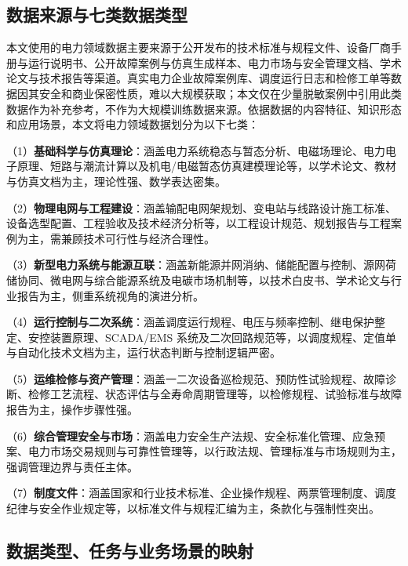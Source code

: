 \documentclass[fontset=fandol,type=master,campus=shenzhen,etitleauto=true]{hithesisbook}
\begin{document}
\subsection{数据来源与七类数据类型}\label{ux6570ux636eux6765ux6e90ux4e0eux4e03ux7c7bux6570ux636eux7c7bux578b}

本文使用的电力领域数据主要来源于公开发布的技术标准与规程文件、设备厂商手册与运行说明书、公开故障案例与仿真生成样本、电力市场与安全管理文档、学术论文与技术报告等渠道。真实电力企业故障案例库、调度运行日志和检修工单等数据因其安全和商业保密性质，难以大规模获取；本文仅在少量脱敏案例中引用此类数据作为补充参考，不作为大规模训练数据来源。依据数据的内容特征、知识形态和应用场景，本文将电力领域数据划分为以下七类：

\noindent （1）\textbf{基础科学与仿真理论}：涵盖电力系统稳态与暂态分析、电磁场理论、电力电子原理、短路与潮流计算以及机电/电磁暂态仿真建模理论等，以学术论文、教材与仿真文档为主，理论性强、数学表达密集。

\noindent （2）\textbf{物理电网与工程建设}：涵盖输配电网架规划、变电站与线路设计施工标准、设备选型配置、工程验收及技术经济分析等，以工程设计规范、规划报告与工程案例为主，需兼顾技术可行性与经济合理性。

\noindent （3）\textbf{新型电力系统与能源互联}：涵盖新能源并网消纳、储能配置与控制、源网荷储协同、微电网与综合能源系统及电碳市场机制等，以技术白皮书、学术论文与行业报告为主，侧重系统视角的演进分析。

\noindent （4）\textbf{运行控制与二次系统}：涵盖调度运行规程、电压与频率控制、继电保护整定、安控装置原理、SCADA/EMS 系统及二次回路规范等，以调度规程、定值单与自动化技术文档为主，运行状态判断与控制逻辑严密。

\noindent （5）\textbf{运维检修与资产管理}：涵盖一二次设备巡检规范、预防性试验规程、故障诊断、检修工艺流程、状态评估与全寿命周期管理等，以检修规程、试验标准与故障报告为主，操作步骤性强。

\noindent （6）\textbf{综合管理安全与市场}：涵盖电力安全生产法规、安全标准化管理、应急预案、电力市场交易规则与可靠性管理等，以行政法规、管理标准与市场规则为主，强调管理边界与责任主体。

\noindent （7）\textbf{制度文件}：涵盖国家和行业技术标准、企业操作规程、两票管理制度、调度纪律与安全作业规定等，以标准文件与规程汇编为主，条款化与强制性突出。

\subsection{数据类型、任务与业务场景的映射}\label{subsec:data-mapping}
\end{document}

